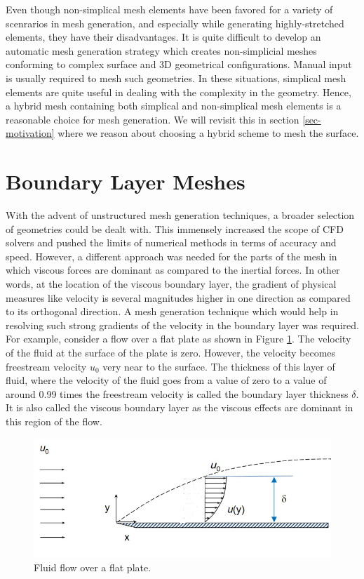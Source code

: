 Even though non-simplical mesh elements have been favored for a variety of scenrarios in mesh generation, and especially while generating highly-stretched elements, they have their disadvantages. It is quite difficult to develop an automatic mesh generation strategy which creates non-simplicial meshes conforming to complex surface and 3D geometrical configurations. Manual input is usually required to mesh such geometries. In these situations, simplical mesh elements are quite useful in dealing with the complexity in the geometry. Hence, a hybrid mesh containing both simplical and non-simplical mesh elements is a reasonable choice for mesh generation. We will revisit this in section \ref{sec-motivation} where we reason about choosing a hybrid scheme to mesh the surface.

\section{Boundary Layer Meshes}
\label{sec-boundaryLayerMesh}

With the advent of unstructured mesh generation techniques, a broader selection of geometries could be dealt with. This immensely increased the scope of CFD solvers and pushed the limits of numerical methods in terms of accuracy and speed. However, a different approach was needed for the parts of the mesh in which viscous forces are dominant as compared to the inertial forces. In other words, at the location of the viscous boundary layer, the gradient of physical measures like velocity is several magnitudes higher in one direction as compared to its orthogonal direction. A mesh generation technique which would help in resolving such strong gradients of the velocity in the boundary layer was required. For example, consider a flow over a flat plate as shown in Figure \ref{fig-boundaryLayer}. The velocity of the fluid at the surface of the plate is zero. However, the velocity becomes freestream velocity $u_0$ very near to the surface. The thickness of this layer of fluid, where the velocity of the fluid goes from a value of zero to a value of around 0.99 times the freestream velocity is called the boundary layer thickness $\delta$. It is also called the viscous boundary layer as the viscous effects are dominant in this region of the flow.

\begin{figure}
  \centering	
  \includegraphics[width=0.8\linewidth]{img/intro/boundaryLayer.png}
  \caption{Fluid flow over a flat plate.}
  \label{fig-boundaryLayer}
\end{figure}

